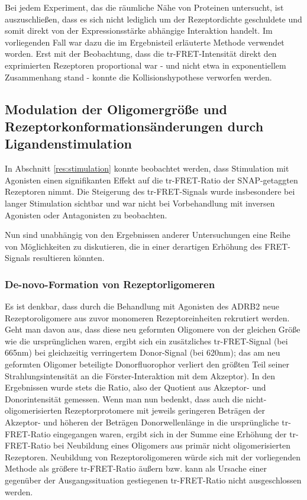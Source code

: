 Bei jedem Experiment, das die räumliche Nähe von Proteinen untersucht, ist auszuschließen, dass es sich nicht lediglich um der Rezeptordichte geschuldete und somit direkt von der Expressionsstärke abhängige Interaktion handelt. Im vorliegenden Fall war dazu die im Ergebnisteil erläuterte Methode verwendet worden. Erst mit der Beobachtung, dass die tr-FRET-Intensität direkt den exprimierten Rezeptoren proportional war - und nicht etwa in exponentiellem Zusammenhang stand - konnte die Kollisionshypothese verworfen werden.



\subsection{Modulation der Oligomergröße und Rezeptorkonformationsänderungen durch Ligandenstimulation}
\label{dis:stimulation}
In Abschnitt \ref{res:stimulation} konnte beobachtet werden, dass Stimulation mit Agonisten einen signifikanten Effekt auf die tr-FRET-Ratio der SNAP-getaggten Rezeptoren nimmt. Die Steigerung des tr-FRET-Signals wurde insbesondere bei langer Stimulation sichtbar und war nicht bei Vorbehandlung mit inversen Agonisten oder Antagonisten zu beobachten.

Nun sind unabhängig von den Ergebnissen anderer Untersuchungen eine Reihe von Möglichkeiten zu diskutieren, die in einer derartigen Erhöhung des FRET-Signals resultieren könnten. 

\subsubsection{De-novo-Formation von Rezeptorligomeren}
Es ist denkbar, dass durch die Behandlung mit Agonisten des ADRB2 neue Rezeptoroligomere aus zuvor monomeren Rezeptoreinheiten rekrutiert werden. Geht man davon aus, dass diese neu geformten Oligomere von der gleichen Größe wie die ursprünglichen waren, ergibt sich ein zusätzliches tr-FRET-Signal (bei 665\si{\nano\meter}) bei gleichzeitig verringertem Donor-Signal (bei 620\si{\nano\meter}); das am neu geformten Oligomer beteiligte Donorfluorophor verliert den größten Teil seiner Strahlungsintensität an die Förster-Interaktion mit dem Akzeptor). In den Ergebnissen wurde stets die Ratio, also der Quotient aus Akzeptor- und Donorintensität gemessen. Wenn man nun bedenkt, dass auch die nicht-oligomerisierten Rezeptorprotomere mit jeweils geringeren Beträgen der Akzeptor- und höheren der Beträgen Donorwellenlänge in die ursprüngliche tr-FRET-Ratio eingegangen waren, ergibt sich in der Summe eine Erhöhung der tr-FRET-Ratio bei Neubildung eines Oligomers aus primär nicht oligomerisierten Rezeptoren. Neubildung von Rezeptoroligomeren würde sich mit der vorliegenden Methode als größere tr-FRET-Ratio äußern bzw. kann als Ursache einer gegenüber der Ausgangssituation gestiegenen tr-FRET-Ratio nicht ausgeschlossen werden.


